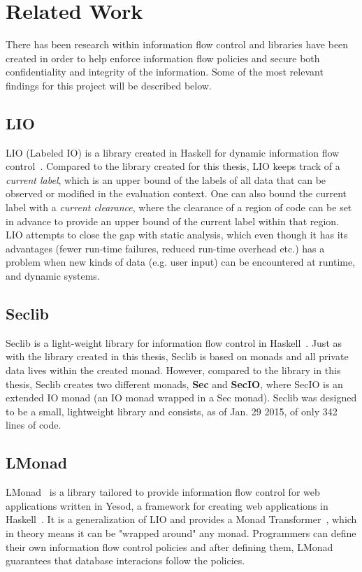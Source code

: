 \section{Related Work}
\label{chapter:related}
There has been research within information flow control and libraries have been created in order to help enforce information flow policies and secure both confidentiality and integrity of the information. Some of the most relevant findings for this project will be described below.
\subsection{LIO}
LIO (Labeled IO) is a library created in Haskell for dynamic information flow control~\cite{lio-2011}. Compared to the library created for this thesis, LIO keeps track of a \emph{current label}, which is an upper bound of the labels of all data that can be observed or modified in the evaluation context. One can also bound the current label with a \emph{current clearance}, where the clearance of a region of code can be set in advance to provide an upper bound of the current label within that region. LIO attempts to close the gap with static analysis, which even though it has its advantages (fewer run-time failures, reduced run-time overhead etc.) has a problem when new kinds of data (e.g. user input) can be encountered at runtime, and dynamic systems.
\subsection{Seclib}
Seclib is a light-weight library for information flow control in Haskell~\cite{seclib, seclib_git}. Just as with the library created in this thesis, Seclib is based on monads and all private data lives within the created monad. However, compared to the library in this thesis, Seclib creates two different monads, \textbf{Sec} and \textbf{SecIO}, where SecIO is an extended IO monad (an IO monad wrapped in a Sec monad). Seclib was designed to be a small, lightweight library and consists, as of Jan. 29 2015, of only 342 lines of code.
\subsection{LMonad}
LMonad~\cite{lmonad} is a library tailored to provide information flow control for web applications written in Yesod, a framework for creating web applications in Haskell~\cite{yesod}. It is a generalization of LIO and provides a Monad Transformer~\cite{monad-transformer}, which in theory means it can be "wrapped around" any monad. Programmers can define their own information flow control policies and after defining them, LMonad guarantees that database interacions follow the policies.
